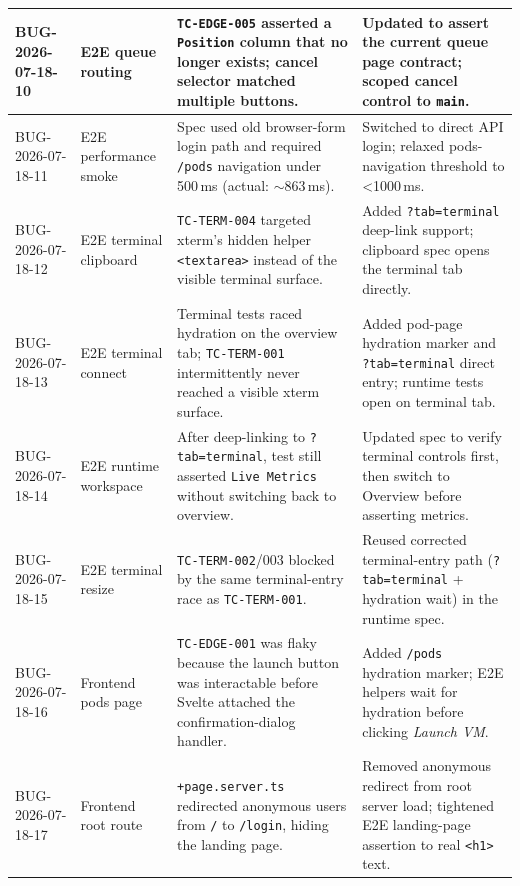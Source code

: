 \documentclass[12pt,a4paper]{article}
\begin{document}
\begin{center}
\begin{longtable}{|>{\RaggedRight\arraybackslash}p{1.9cm}|>{\RaggedRight\arraybackslash}p{2.0cm}|>{\RaggedRight\arraybackslash}p{3.9cm}|>{\RaggedRight\arraybackslash}p{3.8cm}|}
BUG-2026-07-18-10 &
  E2E queue routing &
  \texttt{TC-EDGE-005} asserted a \texttt{Position} column that no longer exists; cancel selector matched multiple buttons. &
  Updated to assert the current queue page contract; scoped cancel control to \texttt{main}. \\
\hline

BUG-2026-07-18-11 &
  E2E performance smoke &
  Spec used old browser-form login path and required \texttt{/pods} navigation under 500\,ms (actual: $\sim$863\,ms). &
  Switched to direct API login; relaxed pods-navigation threshold to \textless1000\,ms. \\
\hline

BUG-2026-07-18-12 &
  E2E terminal clipboard &
  \texttt{TC-TERM-004} targeted xterm's hidden helper \texttt{<textarea>} instead of the visible terminal surface. &
  Added \texttt{?tab=terminal} deep-link support; clipboard spec opens the terminal tab directly. \\
\hline

BUG-2026-07-18-13 &
  E2E terminal connect &
  Terminal tests raced hydration on the overview tab; \texttt{TC-TERM-001} intermittently never reached a visible xterm surface. &
  Added pod-page hydration marker and \texttt{?tab=terminal} direct entry; runtime tests open on terminal tab. \\
\hline

BUG-2026-07-18-14 &
  E2E runtime workspace &
  After deep-linking to \texttt{?tab=terminal}, test still asserted \texttt{Live Metrics} without switching back to overview. &
  Updated spec to verify terminal controls first, then switch to Overview before asserting metrics. \\
\hline

BUG-2026-07-18-15 &
  E2E terminal resize &
  \texttt{TC-TERM-002}/003 blocked by the same terminal-entry race as \texttt{TC-TERM-001}. &
  Reused corrected terminal-entry path (\texttt{?tab=terminal} + hydration wait) in the runtime spec. \\
\hline

BUG-2026-07-18-16 &
  Frontend pods page &
  \texttt{TC-EDGE-001} was flaky because the launch button was interactable before Svelte attached the confirmation-dialog handler. &
  Added \texttt{/pods} hydration marker; E2E helpers wait for hydration before clicking \textit{Launch VM}. \\
\hline

BUG-2026-07-18-17 &
  Frontend root route &
  \texttt{+page.server.ts} redirected anonymous users from \texttt{/} to \texttt{/login}, hiding the landing page. &
  Removed anonymous redirect from root server load; tightened E2E landing-page assertion to real \texttt{<h1>} text. \\
\hline


\end{longtable}
\end{center}
\end{document}
